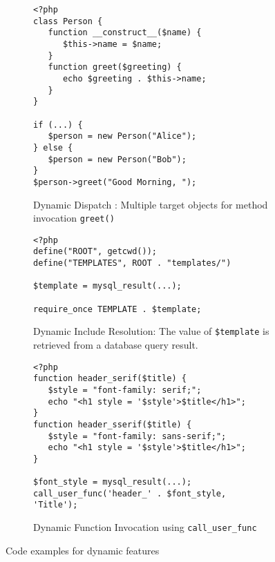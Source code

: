 \documentclass[sigconf]{acmart}
\renewcommand{\tt}[1]{\texttt{#1}}
\begin{document}
\begin{figure}[t]
	\begin{subfigure}[b]{0.48\textwidth}
	
\begin{lstlisting}
<?php
class Person {
   function __construct__($name) {
      $this->name = $name;
   }
   function greet($greeting) {
      echo $greeting . $this->name;
   }
}

if (...) {
   $person = new Person("Alice");
} else {
   $person = new Person("Bob");
}
$person->greet("Good Morning, ");
\end{lstlisting}
	\caption{
		Dynamic Dispatch : Multiple target objects for method invocation \tt{greet()} 
		\label{fig:multi_target}
	}
	\end{subfigure}
	\vspace{2mm}
	\hfill
	\begin{subfigure}[b]{0.48\textwidth}

\begin{lstlisting}
<?php
define("ROOT", getcwd());
define("TEMPLATES", ROOT . "templates/")

$template = mysql_result(...);

require_once TEMPLATE . $template;
\end{lstlisting}
	\caption{
		Dynamic Include Resolution: The value of \tt{\$template} is retrieved from a
		database query result.
		\label{fig:dynamic_includes}
	}
	\end{subfigure}
	\vspace{2mm}
	\hfill
	\begin{subfigure}[b]{0.48\textwidth}

\begin{lstlisting}
<?php
function header_serif($title) {
   $style = "font-family: serif;";
   echo "<h1 style = '$style'>$title</h1>";
}
function header_sserif($title) {
   $style = "font-family: sans-serif;";
   echo "<h1 style = '$style'>$title</h1>";
}

$font_style = mysql_result(...);
call_user_func('header_' . $font_style, 'Title');
\end{lstlisting}
	\caption{
		Dynamic Function Invocation using \tt{call\_user\_func}
		\label{fig:indirect_calls}
	}
	
	\end{subfigure}
	\caption{
		Code examples for dynamic features
		\label{fig:defective_code_features}
	}
\end{figure}
\end{document}
